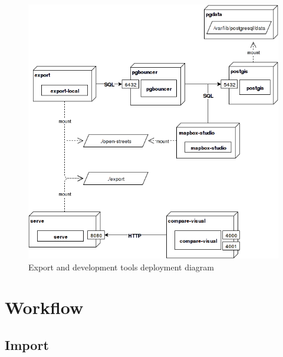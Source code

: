 \begin{figure}[h]
  \includegraphics[scale=0.6]{images/deployment_dev_export.png}
  \caption{Export and development tools deployment diagram}
\end{figure}

\newpage
\section{Workflow}\label{workflow}

\subsection{Import}\label{workflow-import}

